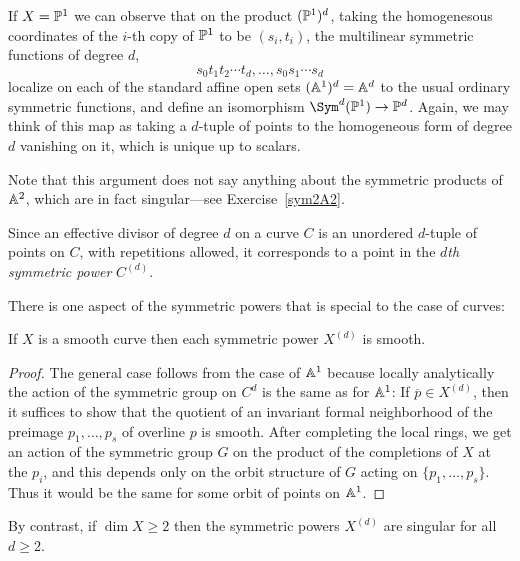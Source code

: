 If $X = \PP^1$ we can observe that on the product $(\PP^1)^d$, taking the homogenesous coordinates of the
$i$-th copy of $\PP^1$ to be $(s_i,t_i)$, the multilinear symmetric functions of degree $d$,
$$
s_0t_1t_2\cdots t_d,\dots,s_0s_1\cdots s_d
$$
localize on each of the standard affine open sets $(\AA^1)^d=\AA^d$ to the usual ordinary symmetric functions, and define
an isomorphism $\Sym^d(\PP^1)\to \PP^d$.
Again, we may think of this map as taking a $d$-tuple of points to the
homogeneous form of degree $d$ vanishing on it, which is unique up to scalars.

Note that this argument does not say anything about the symmetric products of $\AA^2$, which are in fact singular---see Exercise~\ref{sym2A2}.

Since an effective divisor of degree $d$ on a curve $C$ is an unordered $d$-tuple of points on $C$, with repetitions allowed, it corresponds to a point in the \emph{$d$th symmetric power} $C^{(d)}$.

There is one aspect of the symmetric powers that is special to the case of curves:  

\begin{proposition}\label{sym2A2}
If $X$ is a smooth curve then each symmetric power $X^{(d)}$ is smooth.
\end{proposition}
\begin{proof}
 The general case follows from the case of $\AA^{1}$ because locally analytically the action of the symmetric group on $C^d$ is the same as for $\AA^1$: If  $\overline p \in X^{(d)}$, then it suffices to
 show that the quotient of an invariant formal neighborhood of the preimage $p_1,\dots, p_s$ of
 overline $p$ is smooth. After completing the local rings, we get an action of the symmetric group
 $G$ on the product of the completions of $X$ at the $p_i$, and this depends only on the orbit
 structure of $G$ acting on $\{p_1,\dots, p_s\}$. Thus it would be the same for some orbit of
 points on $\AA^1$.
 \end{proof}

By contrast, if $\dim X \geq 2$ then the symmetric powers $X^{(d)}$ are singular for all $d \geq 2$.

